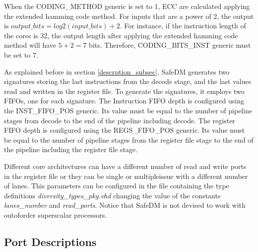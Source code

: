 When the CODING\_METHOD generic is set to 1, ECC are calculated applying the extended hamming code method. For inputs that are a power of 2, the output is \(output\_bits=log2(input\_bits)+2\). For instance, if the instruction length of the cores is 32, the output length after applying the extended hamming code method will have \(5+2=7\) bits. Therefore, CODING\_BITS\_INST generic must be set to 7. 

As explained before in section \ref{descrption_subsec}, SafeDM generates two signatures storing the last instructions from the decode stage, and the last values read and written in the register file. To generate the signatures, it employs two FIFOs, one for each signature. The Instruction FIFO depth is configured using the INST\_FIFO\_POS generic. Its value must be equal to the number of pipeline stages from decode to the end of the pipeline including decode. The register FIFO depth is configured using the REGS\_FIFO\_POS generic. Its value must be equal to the number of pipeline stages from the register file stage to the end of the pipeline including the register file stage.

Different core architectures can have a different number of read and write ports in the register file or they can be single or multiple\-issue with a different number of lanes. This parameters can be configured in the file containing the type definitions \textit{diversity\_types\_pkg.vhd} changing the value of the constants \textit{lanes\_number} and \textit{read\_ports}. Notice that SafeDM is not devised to work with out\-of\-order superscalar processors. 


\subsection{Port Descriptions}
\label{port_description}

